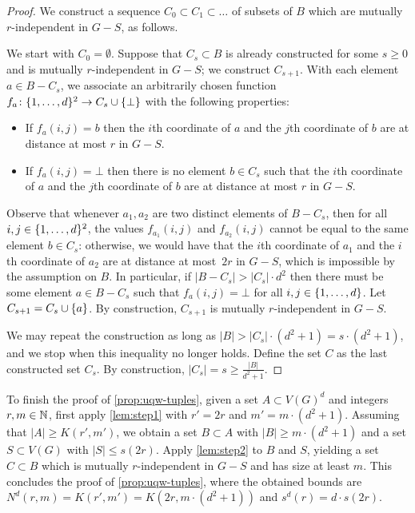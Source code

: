 \begin{proof}
We construct a sequence $C_0\subset C_1\subset \ldots$ of subsets of $B$ which are mutually $r$-independent in $G-S$, as follows.

We start with $C_0=\emptyset$. Suppose that $C_s\subset B$ is 
 already constructed for some $s\ge 0$
 and is mutually $r$-independent in $G-S$; we construct $C_{s+1}$. With each element $a\in B-C_s$,
we associate an arbitrarily chosen function $f_a\colon \{1,\ldots,d\}^2\to C_s\cup \{\bot\}$
with the following properties:
\begin{itemize}
	\item If $f_a(i,j)=b$ then the $i$th coordinate of $a$
	and the $j$th coordinate of $b$ are at distance at most $r$
	in $G-S$.
	\item If $f_a(i,j)=\bot$ then there is no element $b\in C_s$ 
	such that the $i$th coordinate of $a$ and the $j$th coordinate of $b$ are at distance at most $r$ in $G-S$.	
\end{itemize}
Observe that whenever $a_1, a_2$ are two distinct elements of $B-C_s$,
then for all $i,j\in \{1,\ldots,d\}^2$, the values $f_{a_1}(i,j)$ and $f_{a_2}(i,j)$
cannot be equal to the same element $b\in C_s$:
otherwise, we would have that the $i$th coordinate of $a_1$
and the $i$th coordinate of $a_2$ are at distance at most~$2r$
in $G-S$, which is impossible by the assumption on $B$.
In particular, if $|B-C_s|> |C_s|\cdot d^2$
then there must be some element  $a\in B-C_s$  
such that $f_a(i,j)=\bot$  for all $i,j\in\{1,\ldots,d\}$.
Let $C_{s+1}=C_s\cup \{a\}$.
By construction, $C_{s+1}$ is mutually $r$-independent in $G-S$.

We may repeat the construction as long as $|B|>|C_s|\cdot (d^2+1)=s\cdot (d^2+1)$, and we stop when this inequality no longer holds. Define the set $C$ as the last constructed set $C_s$.
By construction, $|C_s|=s\ge 
\frac{|B|}{d^2+1}$.	
\end{proof}

To finish the proof of \cref{prop:uqw-tuples},
given a set $A\subset V(G)^d$ and integers $r,m\in\mathbb{N}$,
first apply 
\cref{lem:step1} 
  with $r'=2r$ and
 $m'= m\cdot (d^2+1)$.
 Assuming that $|A|\ge K(r',m')$, 
we obtain a set $B\subset A$ with $|B|\ge m\cdot (d^2+1)$ and a set $S\subset V(G)$ with $|S|\le s(2r)$.
Apply \cref{lem:step2} to $B$ and $S$, yielding a set $C\subset B$ which is mutually $r$-independent in $G-S$ and has size at least $m$. This concludes the proof of \cref{prop:uqw-tuples},
where the obtained bounds are $N^d(r,m)=K(r',m')=K(2r,m\cdot (d^2+1))$ and $s^d(r)=d\cdot s(2r)$.